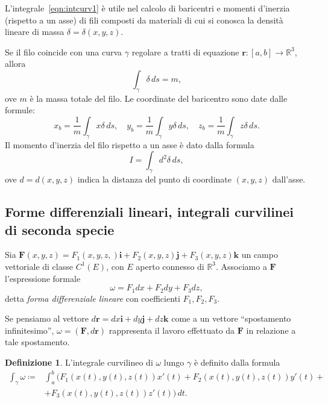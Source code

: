 \documentclass[a4paper]{book}
\numberwithin{equation}{section}
\theoremstyle{plain}
\theoremstyle{definition}
\newtheorem{defn}{Definizione}[section]
\theoremstyle{remark}
\renewcommand{\vec}{\boldsymbol}
\theoremstyle{example}
\begin{document}
L'integrale~\eqref{eqn:intcurv1} è utile nel calcolo di baricentri e momenti d'inerzia (rispetto a un asse) di fili composti da materiali di cui si conosca la densità lineare di massa $\delta = \delta(x, y, z)$.

Se il filo coincide con una curva $\gamma$ regolare a tratti di equazione $\vec{r} \colon\! [a, b] \to \mathbb{R}^3$, allora
\begin{equation*}
	\int_{\gamma} \delta \, ds = m,
\end{equation*}
ove $m$ è la massa totale del filo. Le coordinate del baricentro sono date dalle formule:
\begin{equation}
	x_b = \frac{1}{m} \int_{\gamma}x\delta \, ds, \quad y_b = \frac{1}{m} \int_{\gamma} y\delta \, ds, \quad z_b = \frac{1}{m} \int_{\gamma} z\delta \, ds.
\end{equation}
Il momento d'inerzia del filo rispetto a un asse è dato dalla formula
\begin{equation}
	I = \int_{\gamma} d^2 \delta \, ds,
\end{equation}
ove $d = d(x, y, z)$ indica la distanza del punto di coordinate $(x, y, z)$ dall'asse.

\subsection{Forme differenziali lineari, integrali curvilinei di seconda specie}
Sia $\vec{F}(x, y, z) = F_1(x, y, z,)\vec{i} + F_2(x, y, z)\vec{j} + F_3(x, y, z)\vec{k}$ un campo vettoriale di classe $C^1(E)$, con $E$ aperto connesso di $\mathbb{R}^3$. Associamo a $\vec{F}$ l'espressione formale
\begin{equation}
	\omega = F_1 dx + F_2dy + F_3dz,
\end{equation}
detta \emph{forma differenziale lineare} con coefficienti $F_1, F_2, F_3$.

Se pensiamo al vettore $d\vec{r} = dx\vec{i} + dy\vec{j} + dz\vec{k}$ come a un vettore ``spostamento infinitesimo'', $\omega = (\vec{F}, d\vec{r})$ rappresenta il lavoro effettuato da $\vec{F}$ in relazione a tale spostamento.

\begin{defn}
	L'integrale curvilineo di $\omega$ lungo $\gamma$ è definito dalla formula
	\begin{equation}
		\begin{split}
			\label{eqn:intcurv2}
			\int_{\gamma}\omega \coloneqq &\int_a^b(F_1(x(t), y(t), z(t))x'(t) + F_2(x(t), y(t), z(t))y'(t)+  \\
			&+ F_3(x(t), y(t), z(t))z'(t))\, dt.
		\end{split}
	\end{equation}
\end{defn}
\end{document}
